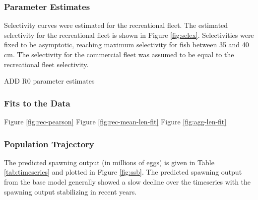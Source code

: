 \documentclass[11pt,
  english,
  a4paper,
]{article}
\begin{document}
\hypertarget{parameter-estimates}{%
\subsubsection{Parameter Estimates}\label{parameter-estimates}}

\leavevmode\tagmcend\tagstructend


Selectivity curves were estimated for the recreational fleet. The estimated selectivity for the recreational fleet is shown in Figure \ref{fig:selex}. Selectivities were fixed to be asymptotic, reaching maximum selectivity for fish between 35 and 40 cm. The selectivity for the commercial fleet was assumed to be equal to the recreational fleet selectivity.

\leavevmode\tagmcend\tagstructend\par


ADD R0 parameter estimates

\leavevmode\tagmcend\tagstructend\par


\hypertarget{fits-to-the-data}{%
\subsubsection{Fits to the Data}\label{fits-to-the-data}}

\leavevmode\tagmcend\tagstructend


Figure \ref{fig:rec-pearson} Figure \ref{fig:rec-mean-len-fit} Figure \ref{fig:agg-len-fit}

\leavevmode\tagmcend\tagstructend\par


\hypertarget{population-trajectory}{%
\subsubsection{Population Trajectory}\label{population-trajectory}}

\leavevmode\tagmcend\tagstructend


The predicted spawning output (in millions of eggs) is given in Table \ref{tab:timeseries} and plotted in Figure \ref{fig:ssb}. The predicted spawning output from the base model generally showed a slow decline over the timeseries with the spawning output stabilizing in recent years.
\end{document}
